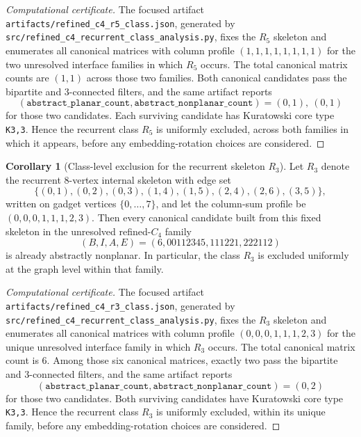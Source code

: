 \documentclass[12pt]{article}
\theoremstyle{definition}
\newtheorem{corollary}[theorem]{Corollary}
\begin{document}
\begin{proof}[Computational certificate]
The focused artifact \texttt{artifacts/refined\_c4\_r5\_class.json}, generated by \texttt{src/refined\_c4\_recurrent\_class\_analysis.py}, fixes the $R_5$ skeleton and enumerates all canonical matrices with column profile $(1,1,1,1,1,1,1,1)$ for the two unresolved interface families in which $R_5$ occurs. The total canonical matrix counts are $(1,1)$ across those two families. Both canonical candidates pass the bipartite and $3$-connected filters, and the same artifact reports
\[
(\texttt{abstract\_planar\_count},\texttt{abstract\_nonplanar\_count})=(0,1),\ (0,1)
\]
for those two candidates. Each surviving candidate has Kuratowski core type \texttt{K3,3}. Hence the recurrent class $R_5$ is uniformly excluded, across both families in which it appears, before any embedding-rotation choices are considered.
\end{proof}

\begin{corollary}[Class-level exclusion for the recurrent skeleton $R_3$]
\label{cor:r3-class-exclusion}
Let $R_3$ denote the recurrent $8$-vertex internal skeleton with edge set
\[
\{(0,1),(0,2),(0,3),(1,4),(1,5),(2,4),(2,6),(3,5)\},
\]
written on gadget vertices $\{0,\dots,7\}$, and let the column-sum profile be $(0,0,0,1,1,1,2,3)$. Then every canonical candidate built from this fixed skeleton in the unresolved refined-$C_4$ family
\[
(B,I,A,E)=(6,00112345,111221,222112)
\]
is already abstractly nonplanar. In particular, the class $R_3$ is excluded uniformly at the graph level within that family.
\end{corollary}

\begin{proof}[Computational certificate]
The focused artifact \texttt{artifacts/refined\_c4\_r3\_class.json}, generated by \texttt{src/refined\_c4\_recurrent\_class\_analysis.py}, fixes the $R_3$ skeleton and enumerates all canonical matrices with column profile $(0,0,0,1,1,1,2,3)$ for the unique unresolved interface family in which $R_3$ occurs. The total canonical matrix count is $6$. Among those six canonical matrices, exactly two pass the bipartite and $3$-connected filters, and the same artifact reports
\[
(\texttt{abstract\_planar\_count},\texttt{abstract\_nonplanar\_count})=(0,2)
\]
for those two candidates. Both surviving candidates have Kuratowski core type \texttt{K3,3}. Hence the recurrent class $R_3$ is uniformly excluded, within its unique family, before any embedding-rotation choices are considered.
\end{proof}
\end{document}
